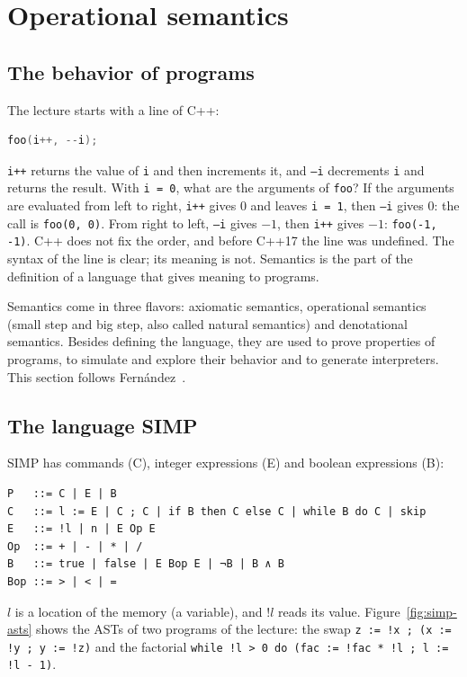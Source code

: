 \section{Operational semantics}
\label{sec:operational}

\subsection{The behavior of programs}

The lecture starts with a line of C++:
\begin{lstlisting}[language=C++]
foo(i++, --i);
\end{lstlisting}
\texttt{i++} returns the value of \texttt{i} and then increments it, and
\texttt{--i} decrements \texttt{i} and returns the result. With \texttt{i = 0},
what are the arguments of \texttt{foo}? If the arguments are evaluated from
left to right, \texttt{i++} gives 0 and leaves \texttt{i = 1}, then
\texttt{--i} gives 0: the call is \texttt{foo(0, 0)}. From right to left,
\texttt{--i} gives $-1$, then \texttt{i++} gives $-1$: \texttt{foo(-1, -1)}. C++
does not fix the order, and before C++17 the line was undefined. The syntax
of the line is clear; its meaning is not. Semantics is the part of the
definition of a language that gives meaning to programs.

Semantics come in three flavors: axiomatic semantics, operational semantics
(small step and big step, also called natural semantics) and denotational
semantics. Besides defining the language, they are used to prove properties
of programs, to simulate and explore their behavior and to generate
interpreters. This section follows Fern\'andez~\cite[Ch.~2, 4, 6, 8]{fernandez2014operational}.

\subsection{The language SIMP}

SIMP has commands (C), integer expressions (E) and boolean expressions (B):
\begin{lstlisting}
P   ::= C | E | B
C   ::= l := E | C ; C | if B then C else C | while B do C | skip
E   ::= !l | n | E Op E
Op  ::= + | - | * | /
B   ::= true | false | E Bop E | ¬B | B ∧ B
Bop ::= > | < | =
\end{lstlisting}
$l$ is a location of the memory (a variable), and $!l$ reads its value.
Figure~\ref{fig:simp-asts} shows the ASTs of two programs of the lecture:
the swap \texttt{z := !x ; (x := !y ; y := !z)} and the factorial
\texttt{while !l > 0 do (fac := !fac * !l ; l := !l - 1)}.

